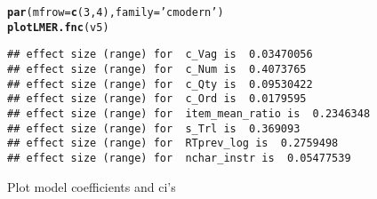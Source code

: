 \documentclass[a4paper]{article}\usepackage[]{graphicx}\usepackage[]{color}
\makeatletter
\newcommand{\hlnum}[1]{\textcolor[rgb]{0.686,0.059,0.569}{#1}}%
\newcommand{\hlstr}[1]{\textcolor[rgb]{0.192,0.494,0.8}{#1}}%
\newcommand{\hlstd}[1]{\textcolor[rgb]{0.345,0.345,0.345}{#1}}%
\newcommand{\hlkwc}[1]{\textcolor[rgb]{0.333,0.667,0.333}{#1}}%
\newcommand{\hlkwd}[1]{\textcolor[rgb]{0.737,0.353,0.396}{\textbf{#1}}}%
\newenvironment{kframe}{%
 \def\at@end@of@kframe{}%
 \ifinner\ifhmode%
  \def\at@end@of@kframe{\end{minipage}}%
  \begin{minipage}{\columnwidth}%
 \fi\fi%
 \def\FrameCommand##1{\hskip\@totalleftmargin \hskip-\fboxsep
 \colorbox{shadecolor}{##1}\hskip-\fboxsep
     \hskip-\linewidth \hskip-\@totalleftmargin \hskip\columnwidth}%
 \MakeFramed {\advance\hsize-\width
   \@totalleftmargin\z@ \linewidth\hsize
   \@setminipage}}%
 {\par\unskip\endMakeFramed%
 \at@end@of@kframe}
\newenvironment{knitrout}{}{} %
\makeatother
\begin{document}
\begin{knitrout}
\color{fgcolor}\begin{kframe}
\begin{alltt}
\hlkwd{par}\hlstd{(}\hlkwc{mfrow}\hlstd{=}\hlkwd{c}\hlstd{(}\hlnum{3}\hlstd{,}\hlnum{4}\hlstd{),} \hlkwc{family}\hlstd{=}\hlstr{'cmodern'}\hlstd{)}
\hlkwd{plotLMER.fnc}\hlstd{(v5)}
\end{alltt}
\begin{verbatim}
## effect size (range) for  c_Vag is  0.03470056 
## effect size (range) for  c_Num is  0.4073765 
## effect size (range) for  c_Qty is  0.09530422 
## effect size (range) for  c_Ord is  0.0179595 
## effect size (range) for  item_mean_ratio is  0.2346348 
## effect size (range) for  s_Trl is  0.369093 
## effect size (range) for  RTprev_log is  0.2759498 
## effect size (range) for  nchar_instr is  0.05477539
\end{verbatim}


{\ttfamily\noindent\bfseries\color{errorcolor}{\#\# Error in plot.new(): figure margins too large}}\end{kframe}
\end{knitrout}

Plot model coefficients and ci's
\end{document}
